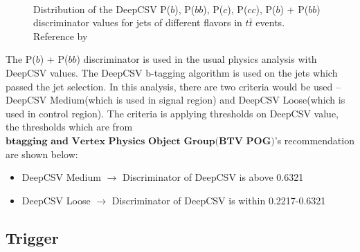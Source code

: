 			\FloatBarrier
			\begin{figure}[H]
			\centering
			    \\
			\caption{Distribution of the DeepCSV P($b$), P($bb$), P($c$), P($cc$), P($b$) + P($bb$) discriminator values for jets of different flavors in $t\bar{t}$ events. Reference by \cite{CMS-BTV-16-002}}
			\label{PhysObj:fig:flavor_discr}
			\end{figure}
			\FloatBarrier

			The P($b$) + P($bb$) discriminator is used in the usual physics analysis with DeepCSV values. The DeepCSV b-tagging algorithm is used on the jets which passed the jet selection. In this analysis, there are two criteria would be used -- DeepCSV Medium(which is used in signal region) and DeepCSV Loose(which is used in control region). The criteria is applying thresholds on DeepCSV value, the thresholds which are from $\textbf{btagging and Vertex Physics Object Group(BTV POG)}$'s\cite{btvpog_twiki} recommendation\cite{btagrecommendation_twiki} are shown below:

			\begin{itemize}
				\item DeepCSV Medium $\rightarrow$ Discriminator of DeepCSV is above 0.6321
				\item DeepCSV Loose $\rightarrow$ Discriminator of DeepCSV is within 0.2217-0.6321
			\label{PhysObj:itm:btag}
			\end{itemize}

	\subsection{Trigger}
	\label{ssec:PhysObj_trg}





\FloatBarrier
